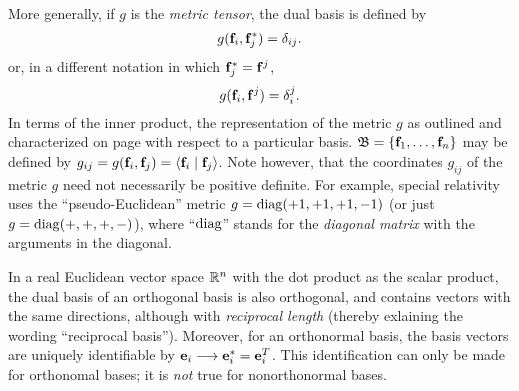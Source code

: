More generally, if $g$ is the {\em metric tensor},
the dual basis is defined by
\begin{equation}
g( {\bf f}_i,{\bf f}_j^*)=\delta_{ij}.
\label{2011-m-Dualbasis-e2}
\end{equation}
or, in a different notation in which ${\bf f}_j^* = {\bf f}^j$,
\begin{equation}
g( {\bf f}_i,{\bf f}^j)=\delta_{i}^j.
\label{2011-m-Dualbasis-e3}
\end{equation}
In terms of the inner product, the representation
of the metric $g$ as outlined and characterized on page \pageref{2011-m-metrict} with respect to a particular basis.
${\frak B} = \{{\bf f}_1,\ldots , {\bf f}_n\}$
may be defined by $g_{ij}=g({\bf f}_i,{\bf f}_j)=\langle {\bf f}_i\mid {\bf f}_j\rangle$.
Note however, that the coordinates $g_{ij}$ of
the metric $g$ need not necessarily be positive definite.
For example,  special relativity uses the ``pseudo-Euclidean'' metric
 $g={\rm diag}(+1,+1,+1,-1)$ (or just $g={\rm diag}(+,+,+,-)$), where ``${\rm diag}$''
stands for the {\em diagonal matrix}
with the arguments in the diagonal.




In a real Euclidean vector space ${\Bbb R}^n$
with the dot product as the scalar product,
the dual basis of an orthogonal basis  is also orthogonal, and contains vectors with the same directions,
although with {\em reciprocal length} (thereby exlaining the wording ``reciprocal basis'').
Moreover, for an orthonormal basis, the basis vectors are uniquely identifiable by
${\bf e}_i \longrightarrow {\bf e}_i^* = {\bf e}_i^T$.
This identification can only be made for orthonomal bases; it is {\em not} true for nonorthonormal bases.

